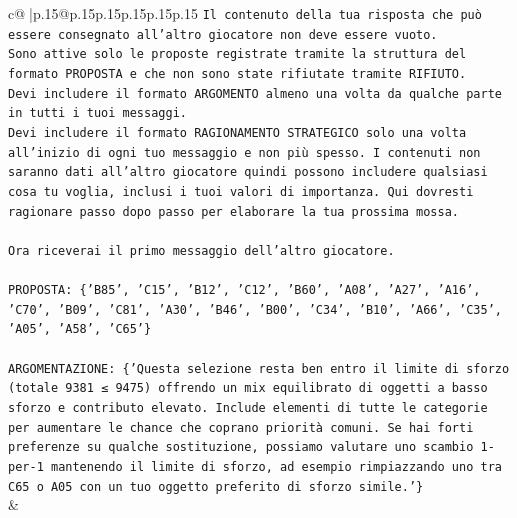 \documentclass{article}
\begin{document}
{\begin{supertabular}{c@{$\;$}|p{.15\linewidth}@{}p{.15\linewidth}p{.15\linewidth}p{.15\linewidth}p{.15\linewidth}p{.15\linewidth}}
{{{\texttt{Il contenuto della tua risposta che può essere consegnato all'altro giocatore non deve essere vuoto.} \\
\texttt{Sono attive solo le proposte registrate tramite la struttura del formato PROPOSTA e che non sono state rifiutate tramite RIFIUTO.} \\
\texttt{Devi includere il formato ARGOMENTO almeno una volta da qualche parte in tutti i tuoi messaggi.} \\
\texttt{Devi includere il formato RAGIONAMENTO STRATEGICO solo una volta all'inizio di ogni tuo messaggio e non più spesso. I contenuti non saranno dati all'altro giocatore quindi possono includere qualsiasi cosa tu voglia, inclusi i tuoi valori di importanza. Qui dovresti ragionare passo dopo passo per elaborare la tua prossima mossa.} \\
\\ 
\texttt{Ora riceverai il primo messaggio dell'altro giocatore.} \\
\\ 
\texttt{PROPOSTA: \{'B85', 'C15', 'B12', 'C12', 'B60', 'A08', 'A27', 'A16', 'C70', 'B09', 'C81', 'A30', 'B46', 'B00', 'C34', 'B10', 'A66', 'C35', 'A05', 'A58', 'C65'\}} \\
\\ 
\texttt{ARGOMENTAZIONE: \{'Questa selezione resta ben entro il limite di sforzo (totale 9381 ≤ 9475) offrendo un mix equilibrato di oggetti a basso sforzo e contributo elevato. Include elementi di tutte le categorie per aumentare le chance che coprano priorità comuni. Se hai forti preferenze su qualche sostituzione, possiamo valutare uno scambio 1{-}per{-}1 mantenendo il limite di sforzo, ad esempio rimpiazzando uno tra C65 o A05 con un tuo oggetto preferito di sforzo simile.'\}} \\
            }
        }
    }
    & \\ \\


\end{supertabular}}
\end{document}
